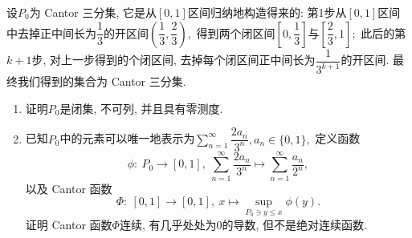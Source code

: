 \begin{question}[points = 10]
设$P_0$为 Cantor 三分集, 它是从$[0, 1]$区间归纳地构造得来的: 第1步从$[0, 1]$区间中去掉正中间长为$\dfrac{1}{3}$的开区间$\left( \dfrac{1}{3}, \dfrac{2}{3} \right),$ 得到两个闭区间$\left[ 0, \dfrac{1}{3} \right]$与$\left[ \dfrac{2}{3}, 1 \right];$ 此后的第$k + 1$步, 对上一步得到的个闭区间, 去掉每个闭区间正中间长为$\dfrac{1}{3^{k+1}}$的开区间. 最终我们得到的集合为 Cantor 三分集.
\begin{enumerate}
\item 证明$P_0$是闭集, 不可列, 并且具有零测度.
\item 已知$P_0$中的元素可以唯一地表示为$\displaystyle \sum\limits_{n=1}^{\infty} \dfrac{2a_n}{3^n}, a_n \in \{0, 1\},$ 定义函数
$$
\phi: ~ P_0 \rightarrow [0, 1], ~ \sum\limits_{n=1}^{\infty} \dfrac{2a_n}{3^n} \mapsto \sum\limits_{n=1}^{\infty} \dfrac{a_n}{2^n},
$$
以及 Cantor 函数
$$
\Phi: ~ [0, 1] \rightarrow [0, 1], ~ x \mapsto \sup\limits_{P_0 \ni y \leqslant x} \phi(y).
$$
证明 Cantor 函数$\Phi$连续, 有几乎处处为0的导数, 但不是绝对连续函数.
  \end{enumerate}

\end{question}


